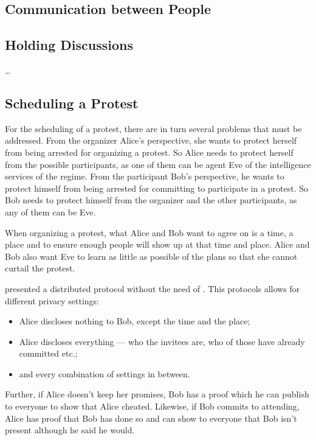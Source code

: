 



\subsection{Communication between People}
\label{Communicating}



\subsection{Holding Discussions}
\label{Discussions}

\citet{multiotr2009} \dots



\subsection{Scheduling a Protest}
\label{Scheduling}

For the scheduling of a protest, there are in turn several problems that must 
be addressed.
From the organizer Alice's perspective, she wants to protect herself from being 
arrested for organizing a protest.
So Alice needs to protect herself from the possible participants, as one of 
them can be agent Eve of the intelligence services of the regime.
From the participant Bob's perspective, he wants to protect himself from being 
arrested for committing to participate in a protest.
So Bob needs to protect himself from the organizer and the other participants, 
as any of them can be Eve.

When organizing a protest, what Alice and Bob want to agree on is a time, 
a place and to ensure enough people will show up at that time and place.
Alice and Bob also want Eve to learn as little as possible of the plans so 
that she cannot curtail the protest.

\citet{EventsInvitations} presented a distributed protocol without the need of 
.
This protocols allows for different privacy settings:
\begin{itemize}
\item Alice discloses nothing to Bob, except the time and the place;
\item Alice discloses everything --- who the invitees are, who of those have 
  already committed etc.;
\item and every combination of settings in between.
\end{itemize}
Further, if Alice doesn't keep her promises, Bob has a proof which he can 
publish to everyone to show that Alice cheated.
Likewise, if Bob commits to attending, Alice has proof that Bob has done so and 
can show to everyone that Bob isn't present although he said he would.

